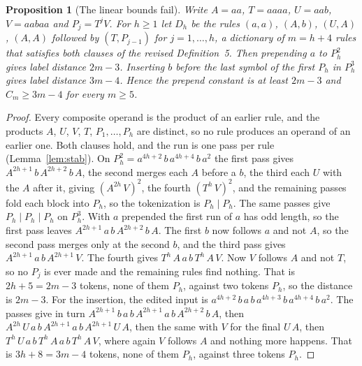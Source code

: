 \documentclass[11pt,a4paper]{article}
\theoremstyle{definition}
\theoremstyle{plain}
\newtheorem{proposition}{Proposition}
\begin{document}

\begin{proposition}[The linear bounds fail]\label{prop:counterfamily}
Write \(A = aa\), \(T = aaaa\), \(U = aab\), \(V = aabaa\) and \(P_j = T^j V\). For \(h \ge 1\) let \(D_h\) be the rules
\((a,a)\), \((A,b)\), \((U,A)\), \((A,A)\) followed by \((T, P_{j-1})\) for \(j = 1, \dots, h\), a dictionary of
\(m = h + 4\) rules that satisfies both clauses of the revised Definition~5. Then prepending \(a\) to \(P_h^2\) gives
label distance \(2m - 3\). Inserting \(b\) before the last symbol of the first \(P_h\) in \(P_h^3\) gives label distance
\(3m - 4\). Hence the prepend constant is at least \(2m - 3\) and \(C_m \ge 3m - 4\) for every \(m \ge 5\).
\end{proposition}

\begin{proof}
Every composite operand is the product of an earlier rule, and the products \(A\), \(U\), \(V\), \(T\),
\(P_1, \dots, P_h\) are distinct, so no rule produces an operand of an earlier one. Both clauses hold, and the run is
one pass per rule (Lemma~\ref{lem:stab}). On \(P_h^2 = a^{4h+2}\,b\,a^{4h+4}\,b\,a^2\) the first pass gives
\(A^{2h+1}\,b\,A^{2h+2}\,b\,A\), the second merges each \(A\) before a \(b\), the third each \(U\) with the \(A\) after
it, giving \((A^{2h}\,V)^2\), the fourth \((T^h\,V)^2\), and the remaining passes fold each block into \(P_h\), so the
tokenization is \(P_h \mid P_h\). The same passes give \(P_h \mid P_h \mid P_h\) on \(P_h^3\). With \(a\) prepended the
first run of \(a\) has odd length, so the first pass leaves \(A^{2h+1}\,a\,b\,A^{2h+2}\,b\,A\). The first \(b\) now
follows \(a\) and not \(A\), so the second pass merges only at the second \(b\), and the third pass gives
\(A^{2h+1}\,a\,b\,A^{2h+1}\,V\). The fourth gives \(T^h\,A\,a\,b\,T^h\,A\,V\). Now \(V\) follows \(A\) and not \(T\), so
no \(P_j\) is ever made and the remaining rules find nothing. That is \(2h + 5 = 2m - 3\) tokens, none of them \(P_h\),
against two tokens \(P_h\), so the distance is \(2m - 3\). For the insertion, the edited input is
\(a^{4h+2}\,b\,a\,b\,a^{4h+3}\,b\,a^{4h+4}\,b\,a^2\). The passes give in turn
\(A^{2h+1}\,b\,a\,b\,A^{2h+1}\,a\,b\,A^{2h+2}\,b\,A\), then \(A^{2h}\,U\,a\,b\,A^{2h+1}\,a\,b\,A^{2h+1}\,U\,A\), then
the same with \(V\) for the final \(U\,A\), then \(T^h\,U\,a\,b\,T^h\,A\,a\,b\,T^h\,A\,V\), where again \(V\) follows
\(A\) and nothing more happens. That is \(3h + 8 = 3m - 4\) tokens, none of them \(P_h\), against three tokens \(P_h\).
\end{proof}
\end{document}
